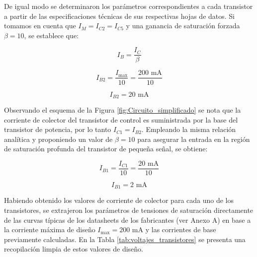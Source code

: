 \documentclass[journal]{IEEEtran}
\begin{document}
    De igual modo se determinaron los parámetros correspondientes a cada transistor a partir 
    de las especificaciones técnicas de sus respectivas hojas de datos. Si tomamos en cuenta 
    que $I_M = I_{C2} = I_{C5}$ y una ganancia de saturación forzada $\beta = 10$, 
    se establece que:

    \begin{equation*}
        I_{B} = \frac{I_{C}}{\beta}
    \end{equation*}

    \begin{equation*}
        I_{B2} = \frac{I_{\text{max}}}{10} = \frac{200\text{ mA}}{10}
    \end{equation*}

    \begin{equation*}
        I_{B2} = 20\text{ mA}
    \end{equation*}

    Observando el esquema de la Figura \ref{fig:Circuito_simplificado} se nota que la corriente 
    de colector del transistor de control es suministrada por la base del transistor de potencia, 
    por lo tanto $I_{C1} = I_{B2}$. Empleando la misma relación analítica y proponiendo un valor 
    de $\beta = 10$ para asegurar la entrada en la región de saturación profunda del transistor 
    de pequeña señal, se obtiene: 

    \begin{equation*}
        I_{B1} = \frac{I_{C1}}{10} = \frac{20\text{ mA}}{10}
    \end{equation*}

    \begin{equation*}
        I_{B1} = 2\text{ mA}
    \end{equation*}

    Habiendo obtenido los valores de corriente de colector para cada uno de los transistores, 
    se extrajeron los parámetros de tensiones de saturación directamente de las curvas típicas 
    de los datasheets de los fabricantes (ver Anexo A) en base a la corriente máxima de 
    diseño $I_{\text{max}} = 200\text{ mA}$ y las corrientes de base previamente calculadas. 
    En la Tabla \ref{tab:voltajes_transistores} se presenta una recopilación limpia de estos 
    valores de diseño.
\end{document}
